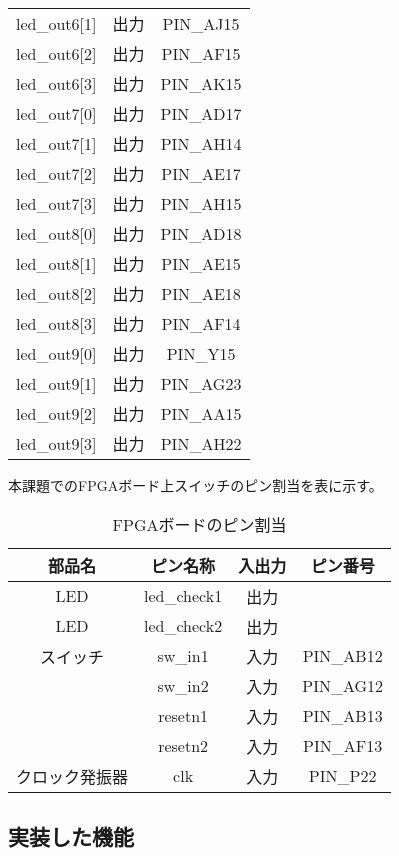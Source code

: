 \documentclass{ltjsarticle}
\begin{document}
\begin{table}[H]
\begin{center}
\begin{tabular}{cc|c}
			led\_out6[1]&出力&PIN\_AJ15\\
			led\_out6[2]&出力&PIN\_AF15\\
			led\_out6[3]&出力&PIN\_AK15\\
			led\_out7[0]&出力&PIN\_AD17\\
			led\_out7[1]&出力&PIN\_AH14\\
			led\_out7[2]&出力&PIN\_AE17\\
			led\_out7[3]&出力&PIN\_AH15\\
			led\_out8[0]&出力&PIN\_AD18\\
			led\_out8[1]&出力&PIN\_AE15\\
			led\_out8[2]&出力&PIN\_AE18\\
			led\_out8[3]&出力&PIN\_AF14\\
			led\_out9[0]&出力&PIN\_Y15\\
			led\_out9[1]&出力&PIN\_AG23\\
			led\_out9[2]&出力&PIN\_AA15\\
			led\_out9[3]&出力&PIN\_AH22\\ \hline
		\end{tabular}
		\end{center}
		\end{table}

	本課題でのFPGAボード上スイッチのピン割当を表に示す。
		\begin{table}[H]
		\begin{center}
		\caption{FPGAボードのピン割当}
		\label{tab:SWpin}
		\begin{tabular}{c|cc|c} \toprule
			部品名&ピン名称&入出力&ピン番号\\ \hline
			LED&led\_check1&出力&\\
			LED&led\_check2&出力&\\ \hline
			スイッチ&sw\_in1&入力&PIN\_AB12\\
			&sw\_in2&入力&PIN\_AG12\\
			&resetn1&入力&PIN\_AB13\\
			&resetn2&入力&PIN\_AF13\\ \hline
			クロック発振器&clk&入力&PIN\_P22\\
		\bottomrule
		\end{tabular}
		\end{center}
		\end{table}
	\subsection{実装した機能}
\end{document}
